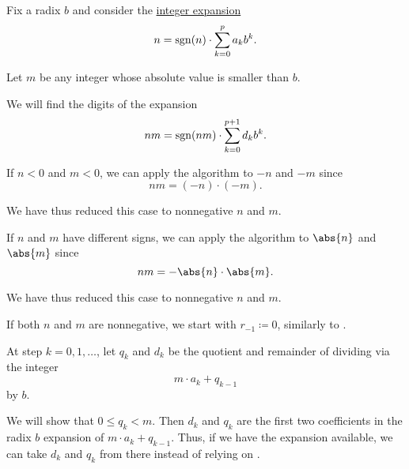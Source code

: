 \begin{algorithm}\label{alg:single_digit_multiplication_with_carrying}
  Fix a radix \( b \) and consider the \hyperref[def:integer_radix_expansion]{integer expansion}
  \begin{equation*}
    n = \operatorname{sgn}(n) \cdot \sum_{k=0}^p a_k b^k.
  \end{equation*}

  Let \( m \) be any integer whose absolute value is smaller than \( b \).

  We will find the digits of the expansion
  \begin{equation*}
    nm = \operatorname{sgn}(nm) \cdot \sum_{k=0}^{p + 1} d_k b^k.
  \end{equation*}

  \begin{thmenum}
     If \( n < 0 \) and \( m < 0 \), we can apply the algorithm to \( -n \) and \( -m \) since
    \begin{equation*}
      nm = (-n) \cdot (-m).
    \end{equation*}

    We have thus reduced this case to nonnegative \( n \) and \( m \).

     If \( n \) and \( m \) have different  signs, we can apply the algorithm to \( \abs{n} \) and \( \abs{m} \) since
    \begin{equation*}
      nm = -\abs{n} \cdot \abs{m}.
    \end{equation*}

    We have thus reduced this case to nonnegative \( n \) and \( m \).

     If both \( n \) and \( m \) are nonnegative, we start with \( r_{-1} \coloneqq 0 \), similarly to .

     At step \( k = 0, 1, \ldots \), let \( q_k \) and \( d_k \) be the quotient and remainder of dividing via  the integer
    \begin{equation}\label{eq:alg:single_digit_multiplication_with_carrying/step/quot}
      m \cdot a_k + q_{k - 1}
    \end{equation}
    by \( b \).

    We will show that \( 0 \leq q_k < m \). Then \( d_k \) and \( q_k \) are the first two coefficients in the radix \( b \) expansion of \( m \cdot a_k + q_{k-1} \). Thus, if we have the expansion available, we can take \( d_k \) and \( q_k \) from there instead of relying on .
  \end{thmenum}
\end{algorithm}
